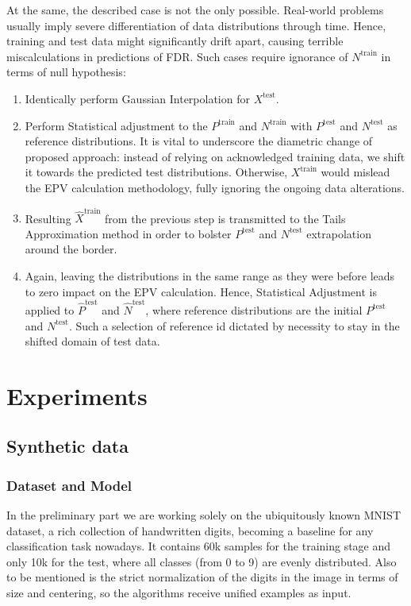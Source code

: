 \documentclass{article}
\begin{document}
At the same, the described case is not the only possible. Real-world problems usually imply severe differentiation of data distributions through time. Hence, training and test data might significantly drift apart, causing terrible miscalculations in predictions of FDR. Such cases require ignorance of $N^{\text{train}}$ in terms of null hypothesis:

\begin{enumerate}
    \item Identically perform Gaussian Interpolation for $X^{\text{test}}$.
    \item Perform Statistical adjustment to the $P^{\text{train}}$ and $N^{\text{train}}$ with $P^{\text{test}}$ and $N^{\text{test}}$ as reference distributions. It is vital to underscore the diametric change of proposed approach: instead of relying on acknowledged training data, we shift it towards the predicted test distributions. Otherwise, $X^{\text{train}}$ would mislead the EPV calculation methodology, fully ignoring the ongoing data alterations.
    \item Resulting $\hat{X}^{\text{train}}$ from the previous step is transmitted to the Tails Approximation method in order to bolster $P^{\text{test}}$ and $N^{\text{test}}$ extrapolation around the border. 
    \item Again, leaving the distributions in the same range as they were before leads to zero impact on the EPV calculation. Hence, Statistical Adjustment is applied to $\hat{P}^{\text{test}}$ and $\hat{N}^{\text{test}}$, where reference distributions are the initial $P^{\text{test}}$ and $N^{\text{test}}$. Such a selection of reference id dictated by necessity to stay in the shifted domain of test data.
\end{enumerate}

\section{Experiments}
\subsection{Synthetic data}

\subsubsection{Dataset and Model}

In the preliminary part we are working solely on the ubiquitously known MNIST dataset, a rich collection of handwritten digits, becoming a baseline for any classification task nowadays. It contains 60k samples for the training stage and only 10k for the test, where all classes (from 0 to 9) are evenly distributed. Also to be mentioned is the strict normalization of the digits in the image in terms of size and centering, so the algorithms receive unified examples as input.
\end{document}

